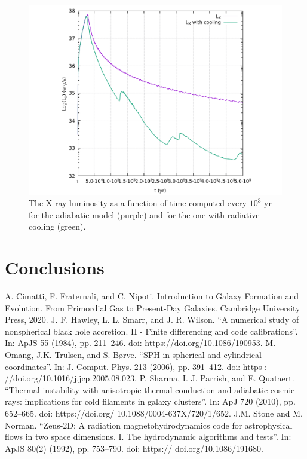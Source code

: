 \documentclass{article}
\begin{document}
\begin{figure}[H]
	\centering
	\includegraphics[width=0.6 \linewidth]{luminosity.pdf}
	\caption{The X-ray luminosity as a function of time computed every $10^3$ yr for the adiabatic model (purple) and for the one with radiative cooling (green).}

	\label{fig:luminosity}
\end{figure}
\section*{Conclusions}

\begin{thebibliography}{5}
	A. Cimatti, F. Fraternali, and C. Nipoti. Introduction to Galaxy Formation and Evolution.
From Primordial Gas to Present-Day Galaxies. Cambridge University Press, 2020.
	J. F. Hawley, L. L. Smarr, and J. R. Wilson. “A numerical study of nonspherical
black hole accretion. II - Finite differencing and code calibrations”. In: ApJS
55 (1984), pp. 211–246. doi: https://doi.org/10.1086/190953.
M. Omang, J.K. Trulsen, and S. Børve. “SPH in spherical and cylindrical
coordinates”. In: J. Comput. Phys. 213 (2006), pp. 391–412. doi: https :
//doi.org/10.1016/j.jcp.2005.08.023.
P. Sharma, I. J. Parrish, and E. Quataert. “Thermal instability with anisotropic
thermal conduction and adiabatic cosmic rays: implications for cold filaments
in galaxy clusters”. In: ApJ 720 (2010), pp. 652–665. doi: https://doi.org/
10.1088/0004-637X/720/1/652.
J.M. Stone and M. Norman. “Zeus-2D: A radiation magnetohydrodynamics
code for astrophysical flows in two space dimensions. I. The hydrodynamic
algorithms and tests”. In: ApJS 80(2) (1992), pp. 753–790. doi: https://
doi.org/10.1086/191680.
\end{thebibliography}
\end{document}
